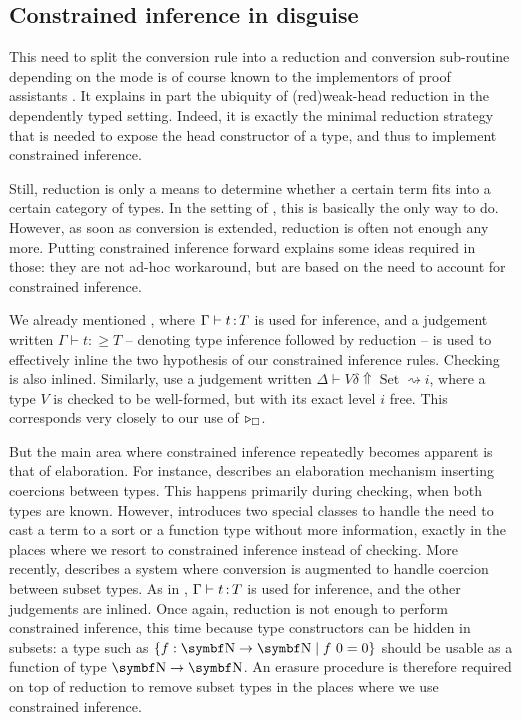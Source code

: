 \subsection{Constrained inference in disguise}

This need to split the conversion rule into a reduction and conversion sub-routine depending on the mode is of course known to the implementors of proof assistants .
It explains in part the ubiquity of \kl(red){weak-head} reduction
in the dependently typed setting.
Indeed, it is exactly the minimal reduction strategy that is needed to expose the
head constructor of a type, and thus to implement constrained inference.

Still, reduction is only a means to determine whether a certain term fits into a certain category of types. In the setting of , this is basically the only way to do.
However, as soon as conversion is extended,
reduction is often not enough any more.
Putting constrained inference forward explains some ideas required in those: 
they are not ad-hoc workaround, but are based on the need to account for constrained inference.

We already mentioned , where $\Gamma \vdash t \operatorname{:} T$ is used
for inference, and a judgement written $\Gamma \vdash t \mathrel{:\geq} T$ –
denoting type inference followed by reduction –
is used to effectively inline the two hypothesis of our constrained inference rules.
Checking is also inlined.
Similarly,  use a judgement written $\Delta \vdash V \delta \Uparrow \operatorname{Set} \rightsquigarrow i$, where a type $V$ is checked to be well-formed, but with its exact level $i$ free. This corresponds very closely to our use of $\pity{\uni}$.

But the main area where constrained inference repeatedly becomes apparent is that of
elaboration. For instance,
 describes an elaboration mechanism inserting coercions between types.
This happens primarily during checking, when both types are known.
However, \citeauthor{Saibi1997} introduces two special classes to handle the need
to cast a term to a sort or a function type without more information,
exactly in the places where we resort to constrained inference instead of checking.
More recently,  describes a system where conversion is augmented
to handle coercion between subset types.
As in \textcite{Pollack1992}, $\Gamma \vdash t \operatorname{:} T$ is used for inference,
and the other judgements are inlined.
Once again, reduction is not enough to perform constrained inference, this time
because type constructors can be hidden in subsets:
a type such as $\{f : \Nat \to \Nat \mid f\ 0 = 0 \}$
should be usable as a function of type $\Nat \to \Nat$.
An erasure procedure is therefore required on top of reduction to remove subset types in the places where we use constrained inference.

